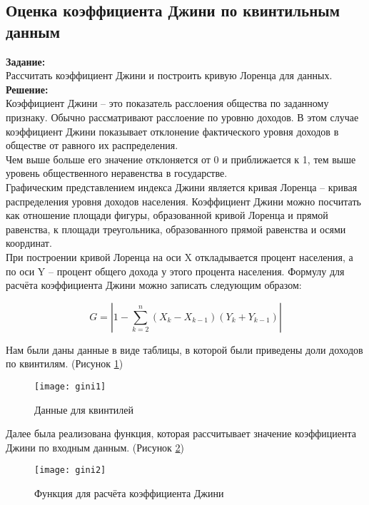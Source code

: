 \subsection*{Оценка коэффициента Джини по квинтильным данным}

\textbf{Задание:}\\
Рассчитать коэффициент Джини и построить кривую Лоренца для данных.\\

\textbf{Решение:}\\
Коэффициент Джини -- это показатель расслоения общества по заданному признаку. Обычно рассматривают расслоение по уровню доходов. В этом случае коэффициент Джини показывает отклонение фактического уровня доходов в обществе от равного их распределения.\\

Чем выше больше его значение отклоняется от 0 и приближается к 1, тем выше уровень общественного неравенства в государстве.\\

Графическим представлением индекса Джини является кривая Лоренца -- кривая распределения уровня доходов населения. Коэффициент Джини можно посчитать как отношение площади фигуры, образованной кривой Лоренца и прямой равенства, к площади треугольника, образованного прямой равенства и осями координат.\\

При построении кривой Лоренца на оси X откладывается процент населения, а по оси Y – процент общего дохода у этого процента населения. Формулу для расчёта коэффициента Джини можно записать следующим образом:

\[ G = |1 - \sum_{k=2}^{n} (X_k - X_{k-1}) (Y_k + Y_{k-1})| \]

Нам были даны данные в виде таблицы, в которой были приведены доли доходов по квинтилям. (Рисунок \ref{fig:gini1})

\begin{figure}[h]
	\centering \texttt{[image: gini1]}
	\caption{Данные для квинтилей}
	\label{fig:gini1}
\end{figure}

\newpage

Далее была реализована функция, которая рассчитывает значение коэффициента Джини по входным данным. (Рисунок \ref{fig:gini2})

\begin{figure}[h]
	\centering \texttt{[image: gini2]}
	\caption{Функция для расчёта коэффициента Джини}
	\label{fig:gini2}
\end{figure}

